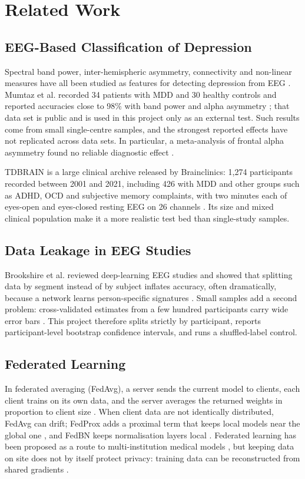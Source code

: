 \documentclass[12pt,a4paper,oneside]{report}
\begin{document}
\chapter{Related Work}

\section{EEG-Based Classification of Depression}
Spectral band power, inter-hemispheric asymmetry, connectivity and non-linear measures have all been studied as features for detecting depression from EEG \cite{review}. Mumtaz et al. recorded 34 patients with MDD and 30 healthy controls and reported accuracies close to 98\% with band power and alpha asymmetry \cite{mumtaz17}; that data set is public \cite{mumtazdata} and is used in this project only as an external test. Such results come from small single-centre samples, and the strongest reported effects have not replicated across data sets. In particular, a meta-analysis of frontal alpha asymmetry found no reliable diagnostic effect \cite{faa}.

TDBRAIN is a large clinical archive released by Brainclinics: 1,274 participants recorded between 2001 and 2021, including 426 with MDD and other groups such as ADHD, OCD and subjective memory complaints, with two minutes each of eyes-open and eyes-closed resting EEG on 26 channels \cite{tdbrain}. Its size and mixed clinical population make it a more realistic test bed than single-study samples.


\section{Data Leakage in EEG Studies}
Brookshire et al. reviewed deep-learning EEG studies and showed that splitting data by segment instead of by subject inflates accuracy, often dramatically, because a network learns person-specific signatures \cite{leak}. Small samples add a second problem: cross-validated estimates from a few hundred participants carry wide error bars \cite{varo}. This project therefore splits strictly by participant, reports participant-level bootstrap confidence intervals, and runs a shuffled-label control.


\section{Federated Learning}
In federated averaging (FedAvg), a server sends the current model to clients, each client trains on its own data, and the server averages the returned weights in proportion to client size \cite{fedavg}. When client data are not identically distributed, FedAvg can drift; FedProx adds a proximal term that keeps local models near the global one \cite{fedprox}, and FedBN keeps normalisation layers local \cite{fedbn}. Federated learning has been proposed as a route to multi-institution medical models \cite{rieke}, but keeping data on site does not by itself protect privacy: training data can be reconstructed from shared gradients \cite{dlg}.
\end{document}
